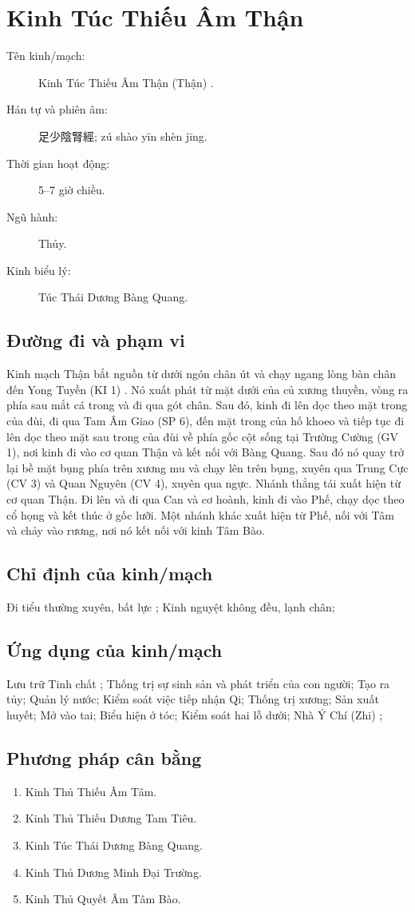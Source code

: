\documentclass[12pt,a4paper]{article}
\begin{document}
\clearpage
\section{Kinh Túc Thiếu Âm Thận}
\begin{description}
\item[Tên kinh/mạch:] Kinh Túc Thiếu Âm Thận (Thận) .
\item[Hán tự và phiên âm:] 足少陰腎經; zú shào yīn shèn jīng.
\item[Thời gian hoạt động:] 5--7 giờ chiều.
\item[Ngũ hành:] Thủy.
\item[Kinh biểu lý:] Túc Thái Dương Bàng Quang.
\end{description}
\subsection*{Đường đi và phạm vi}Kinh mạch Thận bắt nguồn từ dưới ngón chân út và chạy ngang lòng bàn chân đến Yong Tuyền (KI 1) . Nó xuất phát từ mặt dưới của củ xương thuyền, vòng ra phía sau mắt cá trong và đi qua gót chân. Sau đó, kinh đi lên dọc theo mặt trong của đùi, đi qua Tam Âm Giao (SP 6), đến mặt trong của hố khoeo và tiếp tục đi lên dọc theo mặt sau trong của đùi về phía gốc cột sống tại Trường Cường (GV 1), nơi kinh đi vào cơ quan Thận và kết nối với Bàng Quang. Sau đó nó quay trở lại bề mặt bụng phía trên xương mu và chạy lên trên bụng, xuyên qua Trung Cực (CV 3) và Quan Nguyên (CV 4), xuyên qua ngực. Nhánh thẳng tái xuất hiện từ cơ quan Thận. Đi lên và đi qua Can và cơ hoành, kinh đi vào Phế, chạy dọc theo cổ họng và kết thúc ở gốc lưỡi. Một nhánh khác xuất hiện từ Phế, nối với Tâm và chảy vào rương, nơi nó kết nối với kinh Tâm Bào.
\subsection*{Chỉ định của kinh/mạch}Đi tiểu thường xuyên, bất lực ; Kinh nguyệt không đều, lạnh chân;
\subsection*{Ứng dụng của kinh/mạch}Lưu trữ Tinh chất ; Thống trị sự sinh sản và phát triển của con người; Tạo ra tủy; Quản lý nước; Kiểm soát việc tiếp nhận Qi; Thống trị xương; Sản xuất huyết; Mở vào tai; Biểu hiện ở tóc; Kiểm soát hai lỗ dưới; Nhà Ý Chí (Zhi) ;
\subsection*{Phương pháp cân bằng}
\begin{enumerate}
\item Kinh Thủ Thiếu Âm Tâm.
\item Kinh Thủ Thiếu Dương Tam Tiêu.
\item Kinh Túc Thái Dương Bàng Quang.
\item Kinh Thủ Dương Minh Đại Trường.
\item Kinh Thủ Quyết Âm Tâm Bào.
\end{enumerate}
\end{document}
